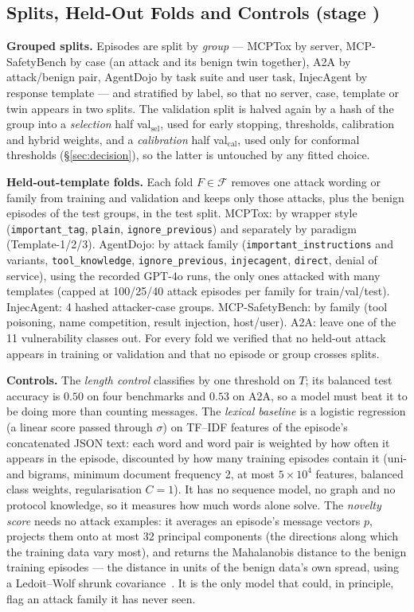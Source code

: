 \documentclass[conference,compsoc]{IEEEtran}
\newcommand{\calF}{\mathcal{F}}
\begin{document}
\subsection{Splits, Held-Out Folds and Controls (stage )}
\label{sec:splits}
\textbf{Grouped splits.} Episodes are split by \emph{group} --- MCPTox by server, MCP-SafetyBench by case (an attack and its benign twin together), A2A by attack/benign pair, AgentDojo by task suite and user task, InjecAgent by response template --- and stratified by label, so that no server, case, template or twin appears in two splits. The validation split is halved again by a hash of the group into a \emph{selection} half val$_{\text{sel}}$, used for early stopping, thresholds, calibration and hybrid weights, and a \emph{calibration} half val$_{\text{cal}}$, used only for conformal thresholds (\S\ref{sec:decision}), so the latter is untouched by any fitted choice.

\textbf{Held-out-template folds.} Each fold $F\in\calF$ removes one attack wording or family from training and validation and keeps only those attacks, plus the benign episodes of the test groups, in the test split. MCPTox: by wrapper style (\texttt{important\_tag}, \texttt{plain}, \texttt{ignore\_previous}) and separately by paradigm (Template-1/2/3). AgentDojo: by attack family (\texttt{important\_instructions} and variants, \texttt{tool\_knowledge}, \texttt{ignore\_previous}, \texttt{injecagent}, \texttt{direct}, denial of service), using the recorded GPT-4o runs, the only ones attacked with many templates (capped at 100/25/40 attack episodes per family for train/val/test). InjecAgent: 4 hashed attacker-case groups. MCP-SafetyBench: by family (tool poisoning, name competition, result injection, host/user). A2A: leave one of the 11 vulnerability classes out. For every fold we verified that no held-out attack appears in training or validation and that no episode or group crosses splits.

\textbf{Controls.} The \emph{length control} classifies by one threshold on $T$; its balanced test accuracy is $0.50$ on four benchmarks and $0.53$ on A2A, so a model must beat it to be doing more than counting messages. The \emph{lexical baseline} is a logistic regression (a linear score passed through $\sigma$) on TF--IDF features of the episode's concatenated JSON text: each word and word pair is weighted by how often it appears in the episode, discounted by how many training episodes contain it (uni- and bigrams, minimum document frequency 2, at most $5\times10^{4}$ features, balanced class weights, regularisation $C=1$). It has no sequence model, no graph and no protocol knowledge, so it measures how much words alone solve. The \emph{novelty score} needs no attack examples: it averages an episode's message vectors $p$, projects them onto at most 32 principal components (the directions along which the training data vary most), and returns the Mahalanobis distance to the benign training episodes --- the distance in units of the benign data's own spread, using a Ledoit--Wolf shrunk covariance~\cite{LedoitWolf2004,Lee2018Mahalanobis}. It is the only model that could, in principle, flag an attack family it has never seen.
\end{document}
